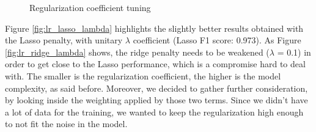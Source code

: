 \begin{figure}[htp!]
	\centering 
	\par 
	\par 
	\caption{Regularization coefficient tuning}
\end{figure}

Figure \ref{fig:lr_lasso_lambda} highlights the slightly better results obtained with the Lasso penalty, with unitary $ \lambda $ coefficient (Lasso F1 score: 0.973).
As Figure \ref{fig:lr_ridge_lambda} shows, the ridge penalty needs to be weakened ($ \lambda $ = 0.1) in order to get close to the Lasso performance, which is a compromise hard to deal with. The smaller is the regularization coefficient, the higher is the model complexity, as said before.
Moreover, we decided to gather further consideration, by looking inside the weighting applied by those two terms.
Since we didn't have a lot of data for the training, we wanted to keep the regularization high enough to not fit the noise in the model.

